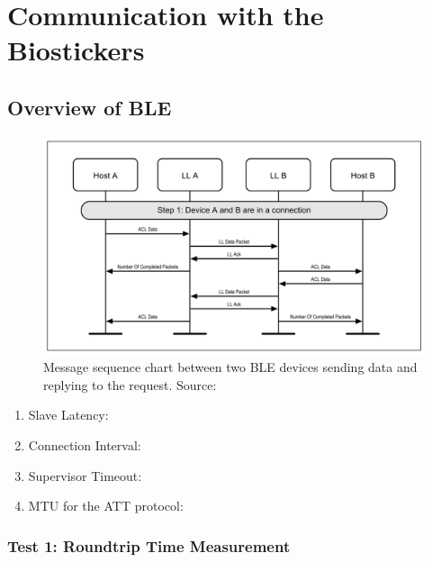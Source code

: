 \section{Communication with the Biostickers}

\subsection{Overview of \acf{BLE}}

\begin{figure}[H]
    \centering
    \includegraphics[width=\linewidth]{images/ble-sending-data.PNG}
    \caption[Message sequence chart between two \acs{BLE} devices sending data and replying to the request.]{Message sequence chart between two \acs{BLE} devices sending data and replying to the request. Source: \cite{Specification1999}}
    \label{fig:differences-between-cloud-services}
\end{figure}


\begin{enumerate}
    \item Slave Latency:
    \item Connection Interval:
    \item Supervisor Timeout:
    \item \acf{MTU} for the \acs{ATT} protocol: 
\end{enumerate}

\subsubsection{Test 1: Roundtrip Time Measurement}

